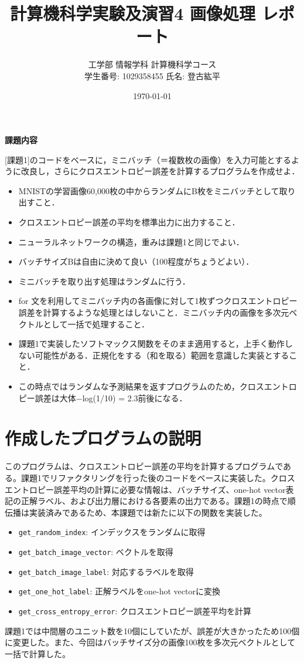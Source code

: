 \documentclass[11px,a4paper]{jsarticle}
\begin{document}
\title{計算機科学実験及演習4 画像処理 レポート}
\author{工学部 情報学科 計算機科学コース\\学生番号: 1029358455 \hspace{1em} 氏名: 登古紘平}
\date{\today}
\maketitle
\newpage

\begin{center}
\textbf{課題内容}
\end{center}
[課題1]のコードをベースに，ミニバッチ（＝複数枚の画像）を入力可能とするように改良し，さらにクロスエントロピー誤差を計算するプログラムを作成せよ．
\begin{itemize}
\item MNISTの学習画像60,000枚の中からランダムにB枚をミニバッチとして取り出すこと．
\item クロスエントロピー誤差の平均を標準出力に出力すること．
\item ニューラルネットワークの構造，重みは課題1と同じでよい．
\item バッチサイズBは自由に決めて良い（100程度がちょうどよい）．
\item ミニバッチを取り出す処理はランダムに行う．
\item for 文を利用してミニバッチ内の各画像に対して1枚ずつクロスエントロピー誤差を計算するような処理とはしないこと．ミニバッチ内の画像を多次元ベクトルとして一括で処理すること．
\item 課題1で実装したソフトマックス関数をそのまま適用すると，上手く動作しない可能性がある．正規化をする（和を取る）範囲を意識した実装とすること．
\item この時点ではランダムな予測結果を返すプログラムのため，クロスエントロピー誤差は大体−log(1/10) = 2.3前後になる．\\
\end{itemize}

\section{作成したプログラムの説明}
このプログラムは、クロスエントロピー誤差の平均を計算するプログラムである。課題1でリファクタリングを行った後のコードをベースに実装した。クロスエントロピー誤差平均の計算に必要な情報は、バッチサイズ、one-hot vector表記の正解ラベル、および出力層における各要素の出力である。課題1の時点で順伝播は実装済みであるため、本課題では新たに以下の関数を実装した。
\begin{itemize}
    \item \verb|get_random_index|: インデックスをランダムに取得
    \item \verb|get_batch_image_vector|: ベクトルを取得
    \item \verb|get_batch_image_label|: 対応するラベルを取得
    \item \verb|get_one_hot_label|: 正解ラベルをone-hot vectorに変換
    \item \verb|get_cross_entropy_error|: クロスエントロピー誤差平均を計算
\end{itemize}
課題1では中間層のユニット数を10個にしていたが、誤差が大きかったため100個に変更した。また、今回はバッチサイズ分の画像100枚を多次元ベクトルとして一括で計算した。
\end{document}
